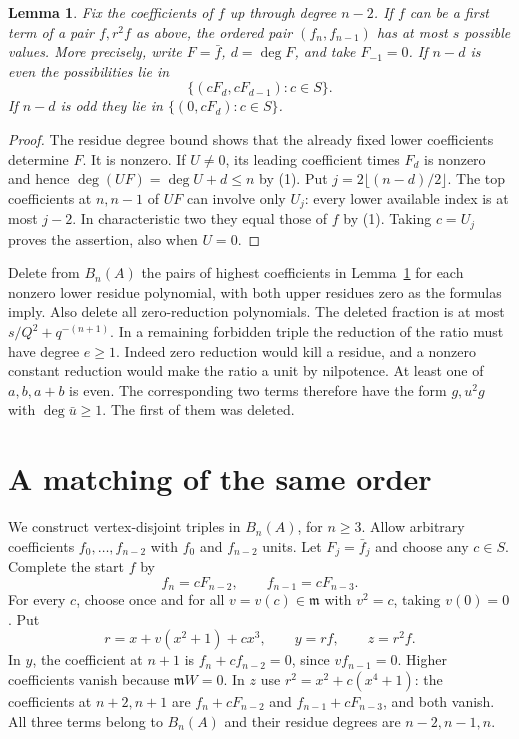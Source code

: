 \documentclass[11pt]{article}
\newtheorem{lemma}[theorem]{Lemma}
\newcommand{\m}{\mathfrak m}
\begin{document}
\begin{lemma}\label{lem:tops}
Fix the coefficients of $f$ up through degree $n-2$. If $f$ can be a first term of a pair $f,r^2f$ as above, the ordered pair $(f_n,f_{n-1})$ has at most $s$ possible values. More precisely, write $F=\bar f$, $d=\deg F$, and take $F_{-1}=0$. If $n-d$ is even the possibilities lie in
\[
              \{(cF_d,cF_{d-1}):c\in S\}.
\]
If $n-d$ is odd they lie in $\{(0,cF_d):c\in S\}$.
\end{lemma}
\begin{proof}
The residue degree bound shows that the already fixed lower coefficients determine $F$. It is nonzero. If $U\ne0$, its leading coefficient times $F_d$ is nonzero and hence $\deg(UF)=\deg U+d\le n$ by (1). Put $j=2\lfloor(n-d)/2\rfloor$. The top coefficients at $n,n-1$ of $UF$ can involve only $U_j$: every lower available index is at most $j-2$. In characteristic two they equal those of $f$ by (1). Taking $c=U_j$ proves the assertion, also when $U=0$.
\end{proof}

Delete from $B_n(A)$ the pairs of highest coefficients in Lemma~\ref{lem:tops} for each nonzero lower residue polynomial, with both upper residues zero as the formulas imply. Also delete all zero-reduction polynomials. The deleted fraction is at most $s/Q^2+q^{-(n+1)}$. In a remaining forbidden triple the reduction of the ratio must have degree $e\ge1$. Indeed zero reduction would kill a residue, and a nonzero constant reduction would make the ratio a unit by nilpotence. At least one of $a,b,a+b$ is even. The corresponding two terms therefore have the form $g,u^2g$ with $\deg\bar u\ge1$. The first of them was deleted.

\section{A matching of the same order}
We construct vertex-disjoint triples in $B_n(A)$, for $n\ge3$. Allow arbitrary coefficients $f_0,\ldots,f_{n-2}$ with $f_0$ and $f_{n-2}$ units. Let $F_j=\bar f_j$ and choose any $c\in S$. Complete the start $f$ by
\[
 f_n=cF_{n-2},\qquad f_{n-1}=cF_{n-3}.
\]
For every $c$, choose once and for all $v=v(c)\in\m$ with $v^2=c$, taking $v(0)=0$. Put
\[
 r=x+v(x^2+1)+cx^3,\qquad y=rf,\qquad z=r^2f .
\]
In $y$, the coefficient at $n+1$ is $f_n+cf_{n-2}=0$, since $vf_{n-1}=0$. Higher coefficients vanish because $\m W=0$. In $z$ use $r^2=x^2+c(x^4+1)$: the coefficients at $n+2,n+1$ are $f_n+cF_{n-2}$ and $f_{n-1}+cF_{n-3}$, and both vanish. All three terms belong to $B_n(A)$ and their residue degrees are $n-2,n-1,n$.
\end{document}
